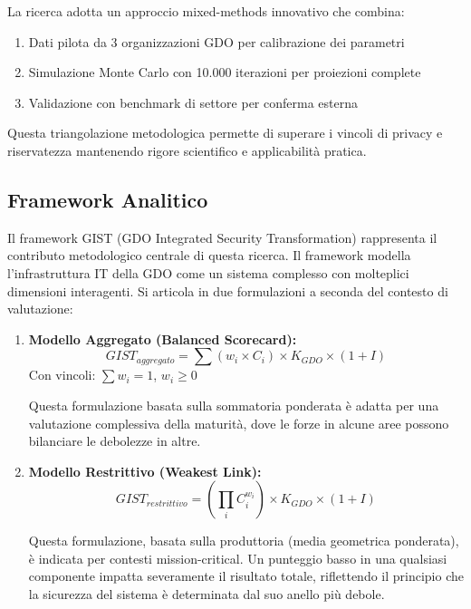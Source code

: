 La ricerca adotta un approccio mixed-methods innovativo che combina:
\begin{enumerate}
\item Dati pilota da 3 organizzazioni GDO per calibrazione dei parametri
\item Simulazione Monte Carlo con 10.000 iterazioni per proiezioni complete
\item Validazione con benchmark di settore per conferma esterna
\end{enumerate}

Questa triangolazione metodologica permette di superare i vincoli di privacy e riservatezza mantenendo rigore scientifico e applicabilità pratica.

\subsection{Framework Analitico}

Il framework GIST (GDO Integrated Security Transformation) rappresenta il contributo metodologico centrale di questa ricerca. Il framework modella l'infrastruttura IT della GDO come un sistema complesso con molteplici dimensioni interagenti. Si articola in due formulazioni a seconda del contesto di valutazione:

\begin{enumerate}
\item \textbf{Modello Aggregato (Balanced Scorecard):} 
\begin{equation}
GIST_{aggregato} = \sum(w_i \times C_i) \times K_{GDO} \times (1+I)
\end{equation}
Con vincoli: $\sum w_i = 1$, $w_i \geq 0$

Questa formulazione basata sulla sommatoria ponderata è adatta per una valutazione complessiva della maturità, dove le forze in alcune aree possono bilanciare le debolezze in altre.

\item \textbf{Modello Restrittivo (Weakest Link):} 
\begin{equation}
GIST_{restrittivo} = \left(\prod_{i} C_i^{w_i}\right) \times K_{GDO} \times (1+I)
\end{equation}

Questa formulazione, basata sulla produttoria (media geometrica ponderata), è indicata per contesti mission-critical. Un punteggio basso in una qualsiasi componente impatta severamente il risultato totale, riflettendo il principio che la sicurezza del sistema è determinata dal suo anello più debole.
\end{enumerate}

